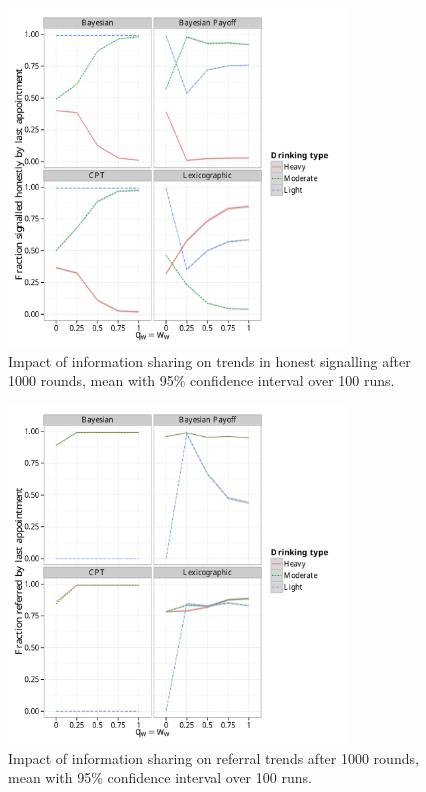 \begin{figure}[H]
\begin{adjustbox}{center}
\includegraphics[width=0.8\textwidth]{figures/honesty_sharing}
\end{adjustbox}
\caption{Impact of information sharing on trends in honest signalling after 1000 rounds, mean with 95\% confidence interval over 100 runs.}
\label{fig:honest_sharing}
\end{figure}

\begin{figure}[H]
\begin{adjustbox}{center}
\includegraphics[width=0.8\textwidth]{figures/ref_sharing}
\end{adjustbox}
\caption{Impact of information sharing on referral trends after 1000 rounds, mean with 95\% confidence interval over 100 runs.}
\label{fig:ref_sharing}
\end{figure}


